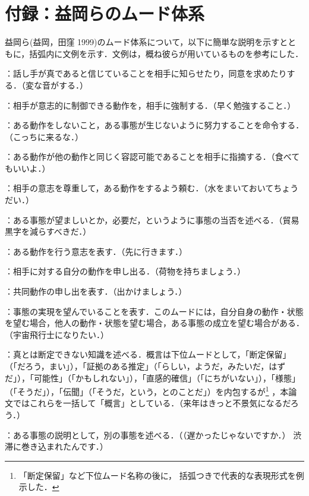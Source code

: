 \documentclass[japanese]{jnlp_1.4}
\newcommand{\InHone}[1]{}
\begin{document}
\section*{付録：益岡らのムード体系}

益岡ら(益岡，田窪 1999)のムード体系について，以下に簡単な説明を示すとともに，括弧内に文例を示す．文例は，概ね彼らが用いているものを参考にした．

\InHone{(a)}
：話し手が真であると信じていることを相手に知らせたり，同意を求めたりする．（変な音がする．）

\InHone{(b)}
：相手が意志的に制御できる動作を，相手に強制する．（早く勉強すること．）

\InHone{(c)}
：ある動作をしないこと，ある事態が生じないように努力することを命令する．（こっちに来るな．）

\InHone{(d)}
：ある動作が他の動作と同じく容認可能であることを相手に指摘する．（食べてもいいよ．）

\InHone{(e)}
：相手の意志を尊重して，ある動作をするよう頼む．（水をまいておいてちょうだい．）

\InHone{(f)}
：ある事態が望ましいとか，必要だ，というように事態の当否を述べる．（貿易黒字を減らすべきだ．）

\InHone{(g)}
：ある動作を行う意志を表す．（先に行きます．）

\InHone{(h)}
：相手に対する自分の動作を申し出る．（荷物を持ちましょう．）

\InHone{(i)}
：共同動作の申し出を表す．（出かけましょう．）

\InHone{(j)}
：事態の実現を望んでいることを表す．このムードには，自分自身の動作・状態を望む場合，他人の動作・状態を望む場合，ある事態の成立を望む場合がある．（宇宙飛行士になりたい．）

\InHone{(k)}
：真とは断定できない知識を述べる．概言は下位ムードとして，「断定保留」（「だろう，まい」），「証拠のある推定」（「らしい，ようだ，みたいだ，はずだ」），「可能性」（「かもしれない」），「直感的確信」（「にちがいない」），「様態」（「そうだ」），「伝聞」（「そうだ，という，とのことだ」）を内包するが\footnote{
	「断定保留」など下位ムード名称の後に，
	括弧つきで代表的な表現形式を例示した．}
，本論文ではこれらを一括して「概言」としている．（来年はきっと不景気になるだろう．）

\InHone{(l)}
：ある事態の説明として，別の事態を述べる．（（遅かったじゃないですか．） 
渋滞に巻き込まれたんです．）
\end{document}
